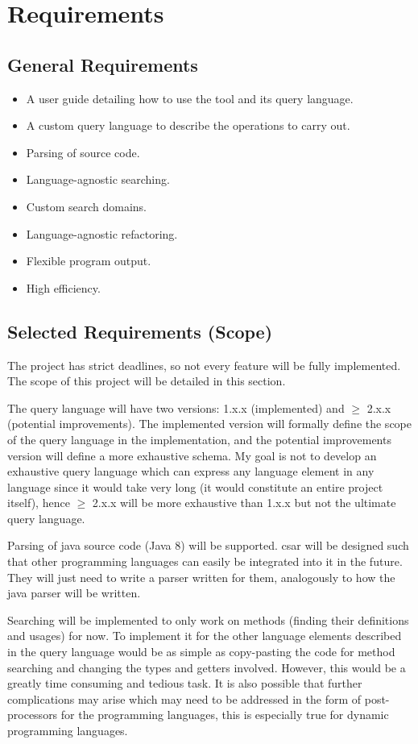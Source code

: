 \documentclass[12pt, letterpaper, oneside]{article}
\begin{document}
\section{Requirements}
\subsection{General Requirements}
\begin{itemize}
    \item A user guide detailing how to use the tool and its query language.
    \item A custom query language to describe the operations to carry out.
    \item Parsing of source code.
    \item Language-agnostic searching.
    \item Custom search domains.
    \item Language-agnostic refactoring.
    \item Flexible program output.
    \item High efficiency.
\end{itemize}

\subsection{Selected Requirements (Scope)}
The project has strict deadlines, so not every feature will be fully implemented.
The scope of this project will be detailed in this section.

The query language will have two versions: 1.x.x (implemented) and $ \geq $ 2.x.x (potential improvements).
The implemented version will formally define the scope of the query language in the implementation, and the potential improvements version will define a more exhaustive schema.
My goal is not to develop an exhaustive query language which can express any language element in any language since it would take very long (it would constitute an entire project itself), hence $ \geq $ 2.x.x will be more exhaustive than 1.x.x but not the ultimate query language.

Parsing of java source code (Java 8) will be supported.
csar will be designed such that other programming languages can easily be integrated into it in the future.
They will just need to write a parser written for them, analogously to how the java parser will be written.

Searching will be implemented to only work on methods (finding their definitions and usages) for now.
To implement it for the other language elements described in the query language would be as simple as copy-pasting the code for method searching and changing the types and getters involved.
However, this would be a greatly time consuming and tedious task.
It is also possible that further complications may arise which may need to be addressed in the form of post-processors for the programming languages, this is especially true for dynamic programming languages.
\end{document}
